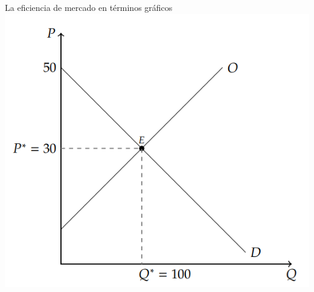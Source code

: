 \documentclass{beamer}
\begin{document}
\begin{frame}{La eficiencia de mercado en términos gráficos}
  \centering
  \includegraphics[scale=0.6]{../Figures/C17.4.png} 
\end{frame}
\end{document}
